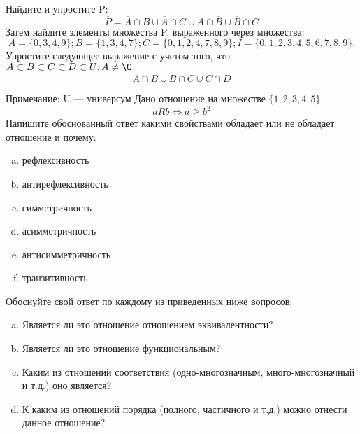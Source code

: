 \documentclass[10pt]{exam}
\begin{document}
\begin{questions}
\question
Найдите и упростите P:
\begin{equation*}
\overline{P} = \overline{A} \cap B \cup \overline{A} \cap C \cup A \cap \overline{B} \cup \overline{B} \cap C
\end{equation*}
Затем найдите элементы множества P, выраженного через множества:
\begin{equation*}
A = \{0, 3, 4, 9\}; 
B = \{1, 3, 4, 7\};
C = \{0, 1, 2, 4, 7, 8, 9\};
I = \{0, 1, 2, 3, 4, 5, 6, 7, 8, 9\}.
\end{equation*}\question
Упростите следующее выражение с учетом того, что $A\subset B \subset C \subset D \subset U; A \neq \O$
\begin{equation*}
\overline{A} \cap \overline{B} \cup B \cap \overline{C} \cup \overline{C} \cap D
\end{equation*}

Примечание: U — универсум\question
Дано отношение на множестве $\{1, 2, 3, 4, 5\}$ 
\begin{equation*}
aRb \iff a \geq b^2
\end{equation*}
Напишите обоснованный ответ какими свойствами обладает или не обладает отношение и почему:   
\begin{enumerate} [a)]\setcounter{enumi}{0}
\item рефлексивность
\item антирефлексивность
\item симметричность
\item асимметричность
\item антисимметричность
\item транзитивность
\end{enumerate}

Обоснуйте свой ответ по каждому из приведенных ниже вопросов:
\begin{enumerate} [a)]\setcounter{enumi}{0}
    \item Является ли это отношение отношением эквивалентности?
    \item Является ли это отношение функциональным?
    \item Каким из отношений соответствия (одно-многозначным, много-многозначный и т.д.) оно является?
    \item К каким из отношений порядка (полного, частичного и т.д.) можно отнести данное отношение?
\end{enumerate}



\end{questions}
\end{document}
